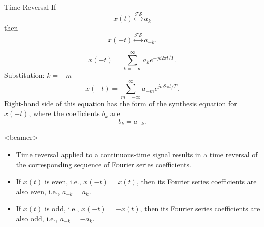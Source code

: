 \begin{frame}[plain]{Time Reversal}
    If
    \begin{equation*}
        x(t) \overset{\mathcal{FS}}{\longleftrightarrow} a_k
    \end{equation*}
    then
    \begin{equation*}
        x(-t) \overset{\mathcal{FS}}{\longleftrightarrow} a_{-k}.
    \end{equation*}
    {

        \begin{equation*}
            x(-t) =  \sum_{k=-\infty}^{\infty}a_ke^{-jk2\pi t/T}.
        \end{equation*}
        Substitution: $k=-m$
        \begin{equation*}
            x(-t) = \sum_{m=-\infty}^{\infty}a_{-m}e^{jm2\pi t/T}.
        \end{equation*}
        Right-hand side of this equation has the form of the \fs synthesis equation for $x(-t)$, where the \fs coefficients  $b_k$ are
        \begin{equation*}
            b_k = a_{-k}.
        \end{equation*}

    }
\end{frame}

\begin{frame}<beamer>
    \begin{itemize}[<+->]
      \item Time reversal applied to a continuous-time signal results in a time reversal of the corresponding sequence of Fourier series coefficients.
      \item If $x(t)$ is even, i.e., $x(-t) = x(t)$, then its Fourier series coefficients are also even, i.e., $a_{-k}=a_k$.
      \item If $x(t)$ is odd, i.e., $x(-t) = -x(t)$, then its Fourier series coefficients are also odd, i.e., $a_{-k}=-a_k$.
    \end{itemize}
\end{frame}


